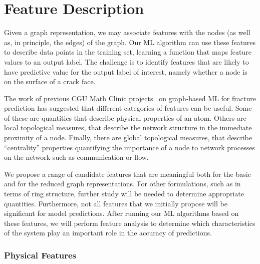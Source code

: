 \section{Feature Description}
\label{subsec: Features}
Given a graph representation, we may associate features with the nodes (as well as, in principle, the edges) of the graph.  Our ML algorithm can use these features to describe data points in the training set, learning a function that maps feature values to an output label.  The challenge is to identify features that are likely to have predictive value for the output label of interest, namely whether a node is on the surface of a crack face.


The work of previous CGU Math Clinic projects~\cite{valera2018machine,schwarzer2019learning} on graph-based ML for fracture prediction has suggested that different categories of features can be useful. Some of these are quantities that describe physical properties of an atom.  Others are local topological measures, that describe the network structure in the immediate proximity of a node. Finally, there are global topological measures, that describe ``centrality'' properties quantifying the importance of a node to network processes on the network such as communication or flow.

We propose a range of candidate features that are meaningful both for the basic and for the reduced graph representations.  For other formulations, such as in terms of ring structure, further study will be needed to determine appropriate quantities.  Furthermore, not all features that we initially propose will be significant for model predictions.  After running our ML algorithms based on these features, we will perform feature analysis to determine which characteristics of the system play an important role in the accuracy of predictions.

\subsubsection{Physical Features}
\label{subsubsec: Physical Features}

